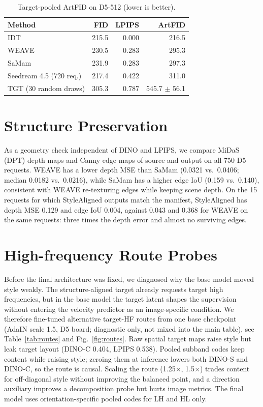 \documentclass[conference]{IEEEtran}
\newcommand{\dinos}{DINO-S}
\newcommand{\dinoc}{DINO-C}
\begin{document}
\begin{table}[t]
\centering
\caption{Target-pooled ArtFID on D5-512 (lower is better).}
\label{tab:artfid}
\footnotesize
\begin{tabular}{@{}lrrr@{}}
\toprule
Method & FID & LPIPS & ArtFID \\
\midrule
IDT & 215.5 & 0.000 & 216.5 \\
WEAVE & 230.5 & 0.283 & 295.3 \\
SaMam & 231.9 & 0.283 & 297.3 \\
Seedream 4.5 (720 req.) & 217.4 & 0.422 & 311.0 \\
TGT (30 random draws) & 305.3 & 0.787 & 545.7 $\pm$ 56.1 \\
\bottomrule
\end{tabular}
\end{table}

\section{Structure Preservation}
\label{sec:structure}

As a geometry check independent of DINO and LPIPS, we compare MiDaS (DPT) depth maps and Canny edge maps
of source and output on all 750 D5 requests. WEAVE has a lower depth MSE than SaMam (0.0321 vs.\
0.0406; median 0.0182 vs.\ 0.0216), while SaMam has a higher edge IoU (0.159 vs.\ 0.140), consistent
with WEAVE re-texturing edges while keeping scene depth. On the 15 requests for which
StyleAligned outputs match the manifest, StyleAligned has depth MSE 0.129 and edge IoU 0.004, against
0.043 and 0.368 for WEAVE on the same requests: three times the depth error and almost no surviving edges.

\section{High-frequency Route Probes}
\label{sec:probes}

Before the final architecture was fixed, we diagnosed why the base model moved style weakly. The
structure-aligned target already requests target high frequencies, but in the base model the
target latent shapes the supervision without entering the velocity predictor as an image-specific
condition. We therefore fine-tuned alternative target-HF routes from one base checkpoint (AdaIN
scale 1.5, D5 board; diagnostic only, not mixed into the main table), see Table~\ref{tab:routes}
and Fig.~\ref{fig:routes}. Raw spatial target maps raise style but leak target layout
(\dinoc{} 0.404, LPIPS 0.538). Pooled subband codes keep content while raising style; zeroing them
at inference lowers both \dinos{} and \dinoc{}, so the route is causal. Scaling the route (1.25$\times$,
1.5$\times$) trades content for off-diagonal style without improving the balanced point, and a
direction auxiliary improves a decomposition probe but hurts image metrics. The final model uses
orientation-specific pooled codes for LH and HL only.
\end{document}
